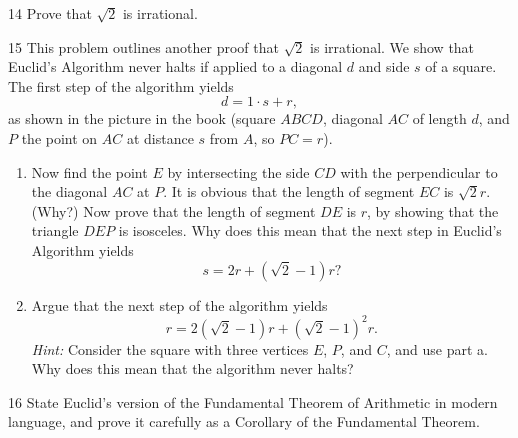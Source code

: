 \begin{problem}{14}
    Prove that $\sqrt{2}$ is irrational.
\end{problem}
\unsolved

\begin{problem}{15}
    This problem outlines another proof that $\sqrt{2}$ is irrational. We show that
    Euclid's Algorithm never halts if applied to a diagonal $d$ and side $s$ of a square.
    The first step of the algorithm yields
    \[d = 1 \cdot s + r,\]
    as shown in the picture in the book (square $ABCD$, diagonal $AC$ of length $d$,
    and $P$ the point on $AC$ at distance $s$ from $A$, so $PC = r$).
    \begin{enumerate}
        \item[(a)] Now find the point $E$ by intersecting the side $CD$ with the
        perpendicular to the diagonal $AC$ at $P$. It is obvious that the length of
        segment $EC$ is $\sqrt{2}r$. (Why?) Now prove that the length of segment $DE$
        is $r$, by showing that the triangle $DEP$ is isosceles.
        Why does this mean that the next step in Euclid's Algorithm yields
        \[s = 2r + (\sqrt{2} - 1)r?\]
        \item[(b)] Argue that the next step of the algorithm yields
        \[r = 2(\sqrt{2} - 1)r + {(\sqrt{2} - 1)}^2 r.\]
        \emph{Hint:} Consider the square with three vertices $E$, $P$, and $C$, and use
        part a. Why does this mean that the algorithm never halts?
    \end{enumerate}
\end{problem}
\unsolved

\begin{problem}{16}
    State Euclid's version of the Fundamental Theorem of Arithmetic in modern
    language, and prove it carefully as a Corollary of the Fundamental Theorem.
\end{problem}
\unsolved

